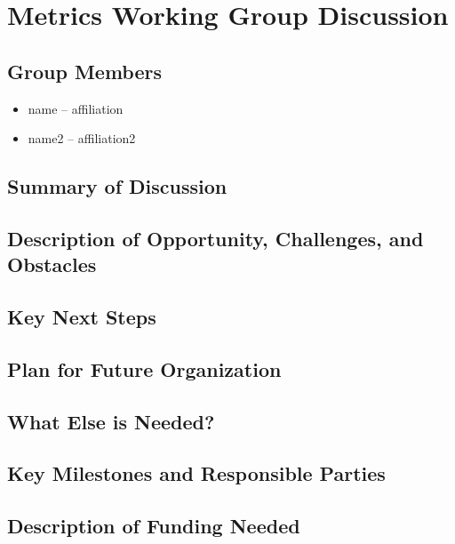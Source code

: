 \section{Metrics Working Group Discussion}
\label{sec:appendix_metrics}

\subsection{Group Members}

\begin{itemize}
\item name -- affiliation
\item name2 -- affiliation2
\end{itemize}

\subsection{Summary of Discussion}

\subsection{Description of Opportunity, Challenges, and Obstacles}


\subsection{Key Next Steps}


\subsection{Plan for Future Organization}


\subsection{What Else is Needed?}


\subsection{Key Milestones and Responsible Parties}


\subsection{Description of Funding Needed}
